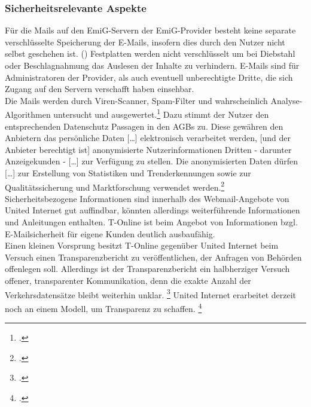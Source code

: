 \documentclass  [paper=a4,
				fontsize=12pt,
				listof=totoc,
				bibliography=totoc
				]{scrreprt}
\begin{document}
		\subsubsection{Sicherheitsrelevante Aspekte}
			Für die Mails auf den \ac{EmiG}-Servern der \ac{EmiG}-Provider besteht keine separate verschlüsselte Speicherung der E-Mails, insofern dies durch den Nutzer nicht selbst geschehen ist. ()
			Festplatten werden nicht verschlüsselt um bei Diebstahl oder Beschlagnahmung das Auslesen der Inhalte zu verhindern.
			E-Mails sind für Administratoren der Provider, als auch eventuell unberechtigte Dritte, die sich Zugang auf den Servern verschafft haben einsehbar.\\
			Die Mails werden durch Viren-Scanner, Spam-Filter und wahrscheinlich Analyse-Algorithmen untersucht und ausgewertet.\footcite[Vgl.][]{Kurz13}
			Dazu stimmt der Nutzer den entsprechenden Datenschutz Passagen in den AGBs zu. Diese gewähren den Anbietern das \glqq [\dots] persönliche Daten [\dots] elektronisch verarbeitet werden, [und der Anbieter berechtigt ist] anonymisierte Nutzerinformationen Dritten - darunter Anzeigekunden - [\dots] zur Verfügung zu stellen. Die anonymisierten Daten dürfen [\dots] zur Erstellung von Statistiken und Trenderkennungen sowie zur Qualitätssicherung und Marktforschung verwendet werden.\grqq \footcite[Vgl.][]{Web2012}\\
			Sicherheitsbezogene Informationen sind innerhalb des Webmail-Angebote von United Internet gut auffindbar, könnten allerdings weiterführende Informationen und Anleitungen enthalten.
			T-Online ist beim Angebot von Informationen bzgl. E-Mailsicherheit für eigene Kunden deutlich ausbaufähig.\\
			Einen kleinen Vorsprung besitzt T-Online gegenüber United Internet beim Versuch einen Transparenzbericht zu veröffentlichen, der Anfragen von Behörden offenlegen soll.
			Allerdings ist der Transparenzbericht ein halbherziger Versuch offener, transparenter Kommunikation, denn  die exakte Anzahl der Verkehrsdatensätze bleibt weiterhin unklar.
			\footcite[Vgl.][]{Beuth14}
			United Internet erarbeitet derzeit noch an einem Modell, um Transparenz zu schaffen.
			\footcite[Vgl.][]{Boehm14}
\end{document}
